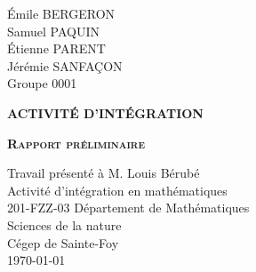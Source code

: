 \documentclass[12pt,letterpaper]{article}
\begin{document}
\begin{titlepage}
    \noindent
    Émile BERGERON\\
    Samuel PAQUIN\\
    Étienne PARENT\\
    Jérémie SANFAÇON\\
    \noindent
    Groupe 0001


    \indent
	\centering
	\vspace{2cm}

	{\scshape\textbf{ACTIVITÉ D'INTÉGRATION}}\\
	{\scshape\textbf{Rapport préliminaire}\par}
	\vspace{2cm}
	{Travail présenté à M.  Louis Bérubé}\\
	\vspace{2cm}
	{Activité d'intégration en mathématiques}\\
    {201-FZZ-03}
	\vfill
	{Département de Mathématiques}\\
	{Sciences de la nature}\\
	{Cégep de Sainte-Foy}\\
	{\large \today}
\end{titlepage}
\end{document}
